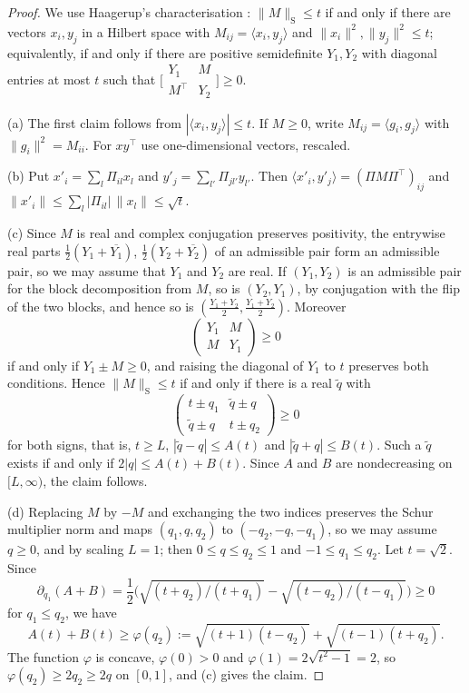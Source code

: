 \begin{proof}
We use Haagerup's characterisation \cite[Chapter~8]{Paulsen2003}: $\|M\|_{\mathrm S}\leq t$ if and only if there are vectors $x_i,y_j$ in a Hilbert space with $M_{ij}=\langle x_i,y_j\rangle$ and $\|x_i\|^2,\|y_j\|^2\leq t$; equivalently, if and only if there are positive semidefinite $Y_1,Y_2$ with diagonal entries at most $t$ such that $\big[\begin{smallmatrix}Y_1&M\\M^\top&Y_2\end{smallmatrix}\big]\geq0$.
 
(a) The first claim follows from $|\langle x_i,y_j\rangle|\leq t$. If $M\geq0$, write $M_{ij}=\langle g_i,g_j\rangle$ with $\|g_i\|^2=M_{ii}$. For $xy^\top$ use one-dimensional vectors, rescaled.
 
(b) Put $x'_i=\sum_l\Pi_{il}x_l$ and $y'_j=\sum_{l'}\Pi_{jl'}y_{l'}$. Then $\langle x'_i,y'_j\rangle=(\Pi M\Pi^\top)_{ij}$ and $\|x'_i\|\leq\sum_l|\Pi_{il}|\,\|x_l\|\leq\sqrt t$.
 
(c) Since $M$ is real and complex conjugation preserves positivity, the entrywise real parts $\frac12(Y_1+\overline{Y_1})$, $\frac12(Y_2+\overline{Y_2})$ of an admissible pair form an admissible pair, so we may assume that $Y_1$ and $Y_2$ are real. If $(Y_1,Y_2)$ is an admissible pair for the block decomposition from $M$, so is $(Y_2,Y_1)$, by conjugation with the flip of the two blocks, and hence so is $(\frac{Y_1+Y_2}2,\frac{Y_1+Y_2}2)$. Moreover \[\begin{pmatrix}Y_1&M\\M&Y_1\end{pmatrix}\geq0\] if and only if $Y_1\pm M\geq0$, and raising the diagonal of $Y_1$ to $t$ preserves both conditions. Hence $\|M\|_{\mathrm S}\leq t$ if and only if there is a real $\tilde q$ with \[\begin{pmatrix}t\pm q_1&\tilde q\pm q\\\tilde q\pm q&t\pm q_2\end{pmatrix}\geq0\] for both signs, that is, $t\geq L$, $|\tilde q-q|\leq A(t)$ and $|\tilde q+q|\leq B(t)$. Such a $\tilde q$ exists if and only if $2|q|\leq A(t)+B(t)$. Since $A$ and $B$ are nondecreasing on $[L,\infty)$, the claim follows.
 
(d) Replacing $M$ by $-M$ and exchanging the two indices preserves the Schur multiplier norm and maps $(q_1,q,q_2)$ to $(-q_2,-q,-q_1)$, so we may assume $q\geq0$, and by scaling $L=1$; then $0\leq q\leq q_2\leq1$ and $-1\leq q_1\leq q_2$. Let $t=\sqrt2$. Since
\[
\partial_{q_1}(A+B)=\frac12\big(\sqrt{(t+q_2)/(t+q_1)}-\sqrt{(t-q_2)/(t-q_1)}\big)\geq0
\]
for $q_1\leq q_2$, we have
\[
A(t)+B(t)\geq\varphi(q_2):=\sqrt{(t+1)(t-q_2)}+\sqrt{(t-1)(t+q_2)}.
\]
The function $\varphi$ is concave, $\varphi(0)>0$ and $\varphi(1)=2\sqrt{t^2-1}=2$, so $\varphi(q_2)\geq2q_2\geq2q$ on $[0,1]$, and (c) gives the claim.
\end{proof}

